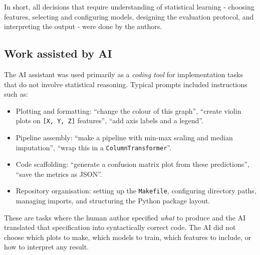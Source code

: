 \documentclass{article}
\begin{document}
In short, all decisions that require understanding of statistical learning -
choosing features, selecting and configuring models, designing the
evaluation protocol, and interpreting the output - were done by the authors.

\subsection*{Work assisted by AI}

The AI assistant was used primarily as a \emph{coding tool} for implementation
tasks that do not involve statistical reasoning.
Typical prompts included instructions such as:

\begin{itemize}
  \item Plotting and formatting: ``change the colour of this graph'',
    ``create violin plots on \texttt{[X, Y, Z]} features'',
    ``add axis labels and a legend''.
  \item Pipeline assembly: ``make a pipeline with min-max scaling and median
    imputation'', ``wrap this in a \texttt{ColumnTransformer}''.
  \item Code scaffolding: ``generate a confusion matrix plot from these
    predictions'', ``save the metrics as JSON''.
  \item Repository organisation: setting up the \texttt{Makefile},
    configuring directory paths, managing imports, and structuring the
    Python package layout.
\end{itemize}

These are tasks where the human author specified \emph{what} to produce and
the AI translated that specification into syntactically correct code.
The AI did not choose which plots to make, which models to train, which
features to include, or how to interpret any result.
\end{document}
